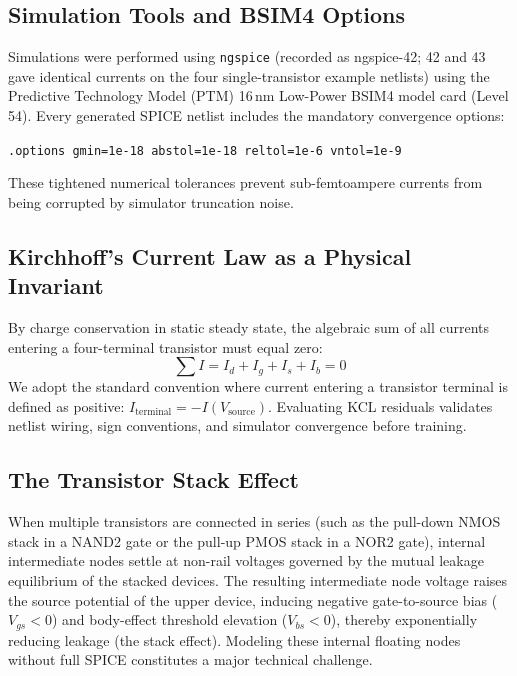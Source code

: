 \documentclass[11pt,a4paper]{article}
\numberwithin{table}{section}
\numberwithin{figure}{section}
\begin{document}
\subsection{Simulation Tools and BSIM4 Options}
Simulations were performed using \texttt{ngspice} (recorded as ngspice-42; 42 and 43 gave identical currents on the four single-transistor example netlists) using the Predictive Technology Model (PTM) 16\,nm Low-Power BSIM4 model card (Level 54). Every generated SPICE netlist includes the mandatory convergence options:
\begin{center}
\texttt{.options gmin=1e-18 abstol=1e-18 reltol=1e-6 vntol=1e-9}
\end{center}
These tightened numerical tolerances prevent sub-femtoampere currents from being corrupted by simulator truncation noise.

\subsection{Kirchhoff's Current Law as a Physical Invariant}
By charge conservation in static steady state, the algebraic sum of all currents entering a four-terminal transistor must equal zero:
\begin{equation}
\sum I = I_d + I_g + I_s + I_b = 0
\end{equation}
We adopt the standard convention where current entering a transistor terminal is defined as positive: $I_{\mathrm{terminal}} = -I(V_{\mathrm{source}})$. Evaluating KCL residuals validates netlist wiring, sign conventions, and simulator convergence before training.

\subsection{The Transistor Stack Effect}
When multiple transistors are connected in series (such as the pull-down NMOS stack in a NAND2 gate or the pull-up PMOS stack in a NOR2 gate), internal intermediate nodes settle at non-rail voltages governed by the mutual leakage equilibrium of the stacked devices. The resulting intermediate node voltage raises the source potential of the upper device, inducing negative gate-to-source bias ($V_{gs} < 0$) and body-effect threshold elevation ($V_{bs} < 0$), thereby exponentially reducing leakage (the stack effect). Modeling these internal floating nodes without full SPICE constitutes a major technical challenge.
\end{document}
